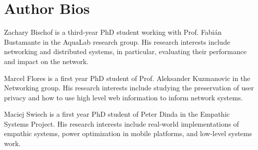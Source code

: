 \documentclass{acm_proc_article-sp}
\begin{document}
\section{Author Bios}

Zachary Bischof is a third-year PhD student working with Prof. Fabi\'{a}n
Bustamante in the AquaLab research group. His research interests include
networking and distributed systems, in particular, evaluating their performance
and impact on the network.

Marcel Flores is a first year PhD student of Prof. Aleksander Kuzmanovic in the
Networking group. His research interests include studying the preservation of
user privacy and how to use high level web information to inform network
systems.

Maciej Swiech is a first year PhD student of Peter Dinda in the Empathic
Systems Project. His research interests include real-world implementations of
empathic systems, power optimization in mobile platforms, and low-level systems
work.


\end{document}
